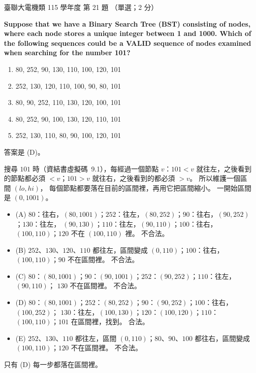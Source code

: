 \begin{pastexam}[label={px:ust-115-ee-ds-21}]{臺聯大電機類 115 學年度 第 21 題}
（單選；2 分）

\textbf{Suppose that we have a Binary Search Tree (BST) consisting of nodes, where each node stores a
unique integer between 1 and 1000. Which of the following sequences could be a VALID sequence of
nodes examined when searching for the number 101?}
\begin{enumerate}[label=(\Alph*)]
\item 80, 252, 90, 130, 110, 100, 120, 101
\item 252, 130, 120, 110, 100, 90, 80, 101
\item 80, 90, 252, 110, 130, 120, 100, 101
\item 80, 252, 90, 100, 130, 120, 110, 101
\item 252, 130, 110, 80, 90, 100, 120, 101
\end{enumerate}
\end{pastexam}

\begin{pastsoln}
答案是 (D)。

搜尋 $101$ 時（資結書虛擬碼~9.1），每經過一個節點 $v$：$101 < v$ 就往左，之後看到的節點都必須
$< v$；$101 > v$ 就往右，之後看到的都必須 $> v$。 所以維護一個區間 $(\mathit{lo}, \mathit{hi})$，
每個節點都要落在目前的區間裡，再用它把區間縮小。 一開始區間是 $(0, 1001)$。

\begin{itemize}
\item (A) $80$：往右，$(80, 1001)$；$252$：往左，$(80, 252)$；$90$：往右，$(90, 252)$；$130$：往左，
$(90, 130)$；$110$：往左，$(90, 110)$；$100$：往右，$(100, 110)$；$120$ 不在 $(100, 110)$ 裡。
不合法。
\item (B) $252$、$130$、$120$、$110$ 都往左，區間變成 $(0, 110)$；$100$：往右，$(100, 110)$；$90$
不在區間裡。 不合法。
\item (C) $80$：$(80, 1001)$；$90$：$(90, 1001)$；$252$：$(90, 252)$；$110$：往左，$(90, 110)$；
$130$ 不在區間裡。 不合法。
\item (D) $80$：$(80, 1001)$；$252$：$(80, 252)$；$90$：$(90, 252)$；$100$：往右，$(100, 252)$；
$130$：往左，$(100, 130)$；$120$：$(100, 120)$；$110$：$(100, 110)$；$101$ 在區間裡，找到。 合法。
\item (E) $252$、$130$、$110$ 都往左，區間 $(0, 110)$；$80$、$90$、$100$ 都往右，區間變成
$(100, 110)$；$120$ 不在區間裡。 不合法。
\end{itemize}
只有 (D) 每一步都落在區間裡。
\end{pastsoln}
